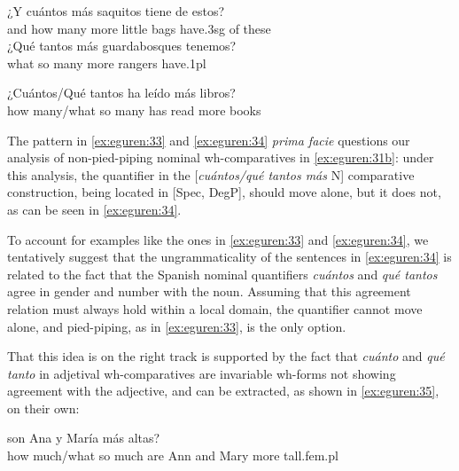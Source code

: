 \documentclass[output=paper,colorlinks,citecolor=brown]{langscibook}
\begin{document}
\begin{exe} 
    \ex\label{ex:eguren:33} 
    \begin{xlist}
\ex\label{ex:eguren:33a}
\gll ¿Y		cuántos		más	saquitos	tiene			de		estos?\\
   and	{how many}	more	{little bags}	have.3sg	of	these \\
\ex\label{ex:eguren:33b}
\gll ¿Qué	tantos	más	guardabosques	tenemos?\\
  what	{so many}	more	rangers		have.1pl\\
\end{xlist}
\end{exe}

\begin{exe} 
    \ex\label{ex:eguren:34} 
 \gll {*} {¿Cuántos/Qué tantos}	ha		leído	más	libros?\\
{} {how many/what so many}	has	read	more	books\\
\end{exe}

The pattern in \ref{ex:eguren:33} and \ref{ex:eguren:34} \textit{prima facie} questions our analysis of non-pied-piping nominal wh-comparatives in \ref{ex:eguren:31b}: under this analysis, the quantifier in the [\textit{cuántos/qué tantos más} N] comparative construction, being located in [Spec, DegP], should move alone, but it does not, as can be seen in \ref{ex:eguren:34}.

To account for examples like the ones in \ref{ex:eguren:33} and \ref{ex:eguren:34}, we tentatively suggest that  the ungrammaticality of the sentences in \ref{ex:eguren:34} is related to the fact that the Spanish nominal quantifiers \textit{cuántos} and \textit{qué tantos} agree in gender and number with the noun. Assuming that this agreement relation must always hold within a local domain, the quantifier cannot move alone, and pied-piping, as in \ref{ex:eguren:33}, is the only option.

That this idea is on the right track is supported by the fact that \textit{cuánto} and \textit{qué tanto} in adjetival wh-comparatives are invariable wh-forms not showing agreement with the adjective, and can be extracted, as shown in \ref{ex:eguren:35}, on their own:

\begin{exe} 
    \ex\label{ex:eguren:35} 
 son	Ana	y	María	más	altas?\\
 {how much/what so much} are	Ann	and	Mary more tall.fem.pl\\
\end{exe}
\end{document}
